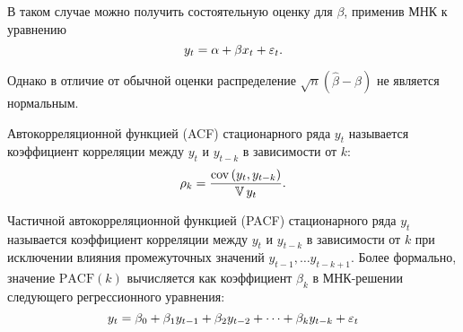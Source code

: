 В таком случае можно получить состоятельную оценку для $\beta$, применив МНК к уравнению
\begin{equation*}
    y_t = \alpha + \beta x_t + \varepsilon_t.
\end{equation*}

Однако в отличие от обычной оценки распределение $\sqrt{n} \left( \hat\beta - \beta \right)$ не является нормальным.


\begin{definition}
    Автокорреляционной функцией (ACF) стационарного ряда $y_t$ называется коэффициент корреляции между $y_t$ и $y_{t-k}$ в зависимости от $k$:
    \begin{equation*}
        \rho_k = \frac{\operatorname{cov}\left( y_t, y_{t-k} \right)}{\operatorname{\mathbb{V}} y_t}.
    \end{equation*}
\end{definition}

\begin{definition}
    Частичной автокорреляционной функцией (PACF) стационарного ряда $y_t$ называется коэффициент корреляции между $y_t$ и $y_{t-k}$ в зависимости от $k$ при исключении влияния промежуточных значений $y_{t-1}, \dots y_{t-k+1}$. Более формально, значение $\mathrm{PACF}(k)$ вычисляется как коэффициент $\beta_k$ в МНК-решении следующего регрессионного уравнения:
    \begin{equation*}
        y_t = \beta_0 + \beta_1 y_{t-1} + \beta_2 y_{t-2} + \dots + \beta_k y_{t-k} + \varepsilon_t
    \end{equation*}
\end{definition}





















